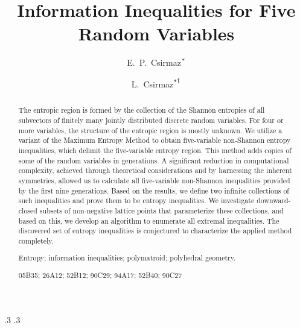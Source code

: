 \documentclass[reqno]{amsart}
\title{Information Inequalities for Five Random Variables}
\author{E.~P.~Csirmaz${\strut}^*$}
\author{L.~Csirmaz${\strut}^{*\dagger}$}
\date{}
\theoremstyle{definition}
\def\r{\mathbfit r}
\def\b{\mathbfit b}
\begin{document}
\def\r{\mathbfit r}
\def\b{\mathbfit b}
\advance\abovedisplayskip.3\baselineskip
\advance\belowdisplayskip.3\baselineskip
\makeatletter
\let\atopwithdelims\@@atopwithdelims
\def\section{\@startsection{section}{1}%
  \z@{1.0\linespacing\@plus\linespacing}{.7\linespacing}%
  {\normalfont\scshape\centering}}
\makeatother
\begin{abstract}

The entropic region is formed by the collection of the Shannon entropies of
all subvectors of finitely many jointly distributed discrete random
variables. For four or more variables, the structure of the entropic region
is mostly unknown. We utilize a variant of the Maximum Entropy Method to
obtain five-variable non-Shannon entropy inequalities, which delimit the
five-variable entropy region. This method adds copies of some of the random
variables in generations. A significant reduction in computational
complexity, achieved through theoretical considerations and by harnessing
the inherent symmetries, allowed us to calculate all five-variable
non-Shannon inequalities provided by the first nine generations. Based on
the results, we define two infinite collections of such inequalities and
prove them to be entropy inequalities. We investigate downward-closed
subsets of non-negative lattice points that parameterize these collections,
and based on this, we develop an algorithm to enumerate all extremal
inequalities. The discovered set of entropy inequalities is conjectured to
characterize the applied method completely.

\smallskip

 Entropy; information inequalities; polymatroid;
polyhedral geometry.

\smallskip
{}
05B35; %
26A12; %
52B12; %
90C29; %
94A17; %
52B40; %
90C27 %

\end{abstract}
\end{document}
